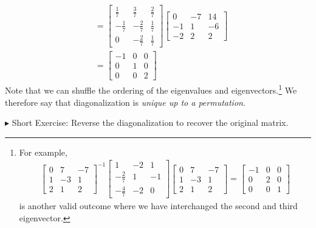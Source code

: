 \begin{solution}
\begin{align*}
&=
\begin{bmatrix}
\frac{1}{7}&\frac{3}{7}&\frac{2}{7}\\ 
-\frac{1}{7}&-\frac{2}{7}&\frac{1}{7}\\ 
0&-\frac{2}{7}&\frac{1}{7}
\end{bmatrix}
\begin{bmatrix}
0&-7&14\\ 
-1&1&-6\\ 
-2&2&2
\end{bmatrix} \\
&=
\begin{bmatrix}
-1 & 0 & 0 \\
0 & 1 & 0 \\
0 & 0 & 2
\end{bmatrix}
\end{align*}
Note that we can shuffle the ordering of the eigenvalues and eigenvectors.\footnote{For example, \begin{align*}
\begin{bmatrix}
0 & 7 & -7 \\ 
1 & -3 & 1 \\ 
2 & 1 & 2 
\end{bmatrix}^{-1}
\begin{bmatrix}
1 & -2 & 1 \\ 
-\frac{2}{7} & 1 & -1 \\ 
-\frac{4}{7} & -2 & 0
\end{bmatrix}
\begin{bmatrix}
0 & 7 & -7 \\ 
1 & -3 & 1 \\ 
2 & 1 & 2 
\end{bmatrix} 
=
\begin{bmatrix}
-1 & 0 & 0 \\
0 & 2 & 0 \\
0 & 0 & 1
\end{bmatrix}
\end{align*} is another valid outcome where we have interchanged the second and third eigenvector.} We therefore say that diagonalization is \textit{unique up to a permutation}.
\end{solution}
$\blacktriangleright$ Short Exercise: Reverse the diagonalization to recover the original matrix.\footnotemark

